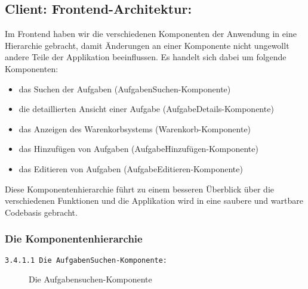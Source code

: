 \subsection{Client: Frontend-Architektur:} 

Im Frontend haben wir die verschiedenen Komponenten der Anwendung in eine Hierarchie gebracht, damit Änderungen an einer Komponente nicht ungewollt andere Teile der Applikation beeinflussen. 
Es handelt sich dabei um folgende Komponenten:

\begin{itemize}
  \item das Suchen der Aufgaben (AufgabenSuchen-Komponente)
  
  \item die detaillierten Ansicht einer Aufgabe (AufgabeDetails-Komponente)
\item das Anzeigen des Warenkorbsystems (Warenkorb-Komponente) 
  
  \item das Hinzufügen von Aufgaben (AufgabeHinzufügen-Komponente)
  
  \item das Editieren von Aufgaben (AufgabeEditieren-Komponente)
  

\end{itemize}

Diese Komponentenhierarchie führt zu einem besseren Überblick über die verschiedenen Funktionen und die Applikation wird in eine saubere und wartbare Codebasis gebracht.


\subsubsection{Die Komponentenhierarchie}

\texttt{3.4.1.1 Die AufgabenSuchen-Komponente:}
\begin{figure}[ht]
  \caption{Die Aufgabensuchen-Komponente \cite{fig:aufgabensuche}}
\end{figure}


